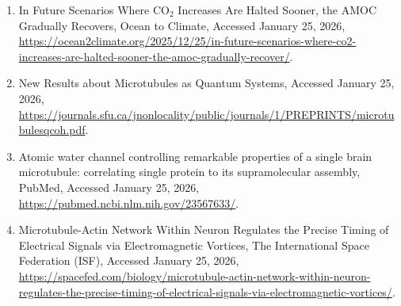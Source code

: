 \documentclass[11pt,a4paper]{article}
\begin{document}
\begin{enumerate}
\item In Future Scenarios Where CO$_2$ Increases Are Halted Sooner, the AMOC Gradually Recovers, Ocean to Climate, Accessed January 25, 2026, \url{https://ocean2climate.org/2025/12/25/in-future-scenarios-where-co2-increases-are-halted-sooner-the-amoc-gradually-recover/}.
\item New Results about Microtubules as Quantum Systems, Accessed January 25, 2026, \url{https://journals.sfu.ca/jnonlocality/public/journals/1/PREPRINTS/microtubulesqcoh.pdf}.
\item Atomic water channel controlling remarkable properties of a single brain microtubule: correlating single protein to its supramolecular assembly, PubMed, Accessed January 25, 2026, \url{https://pubmed.ncbi.nlm.nih.gov/23567633/}.
\item Microtubule-Actin Network Within Neuron Regulates the Precise Timing of Electrical Signals via Electromagnetic Vortices, The International Space Federation (ISF), Accessed January 25, 2026, \url{https://spacefed.com/biology/microtubule-actin-network-within-neuron-regulates-the-precise-timing-of-electrical-signals-via-electromagnetic-vortices/}.
\end{enumerate}
\end{document}
